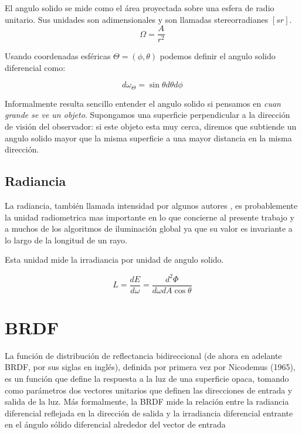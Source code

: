 El angulo solido se mide como el área proyectada sobre una esfera de radio unitario. Sus unidades son adimensionales y son llamadas stereorradianes $[sr]$.
\begin{equation}
\Omega = \frac{A}{r^2}
\end{equation}


Usando coordenadas esféricas $\Theta = (\phi , \theta )$ podemos definir el angulo solido diferencial como:

\begin{equation}
d \omega _ \Theta = \sin \theta d \theta d \phi
\end{equation}

Informalmente resulta sencillo entender el angulo solido si pensamos en \emph{cuan grande se ve un objeto}. Supongamos una superficie perpendicular a la dirección de visión del observador: si este objeto esta muy cerca, diremos que subtiende un angulo solido mayor que la misma superficie a una mayor distancia en la misma dirección.

\clearpage

\subsection{Radiancia}

La radiancia, también llamada intensidad por algunos autores \cite{Kajiya1986, Immel1986}, es probablemente la unidad radiometrica mas importante en lo que concierne al presente trabajo y a muchos de los algoritmos de iluminación global ya que su valor es invariante a lo largo de la longitud de un rayo.

Esta unidad mide la irradiancia por unidad de angulo solido.

\begin{equation}
L = \frac{dE}{d\omega} = \frac{d^2\Phi}{d\omega dA\cos \theta} 
\end{equation}


\clearpage

\section{BRDF}

La función de distribución de reflectancia bidireccional (de ahora en adelante BRDF, por sus siglas en inglés), definida por primera vez por \cite{Nicodemus1965} Nicodemus (1965), es un función que define la respuesta a la luz de una superficie opaca, tomando como parámetros dos vectores unitarios que definen las direcciones de entrada y salida de la luz. Más formalmente, la BRDF mide la relación entre la radiancia diferencial reflejada en la dirección de salida y la irradiancia diferencial entrante en el ángulo sólido diferencial alrededor del vector de entrada

